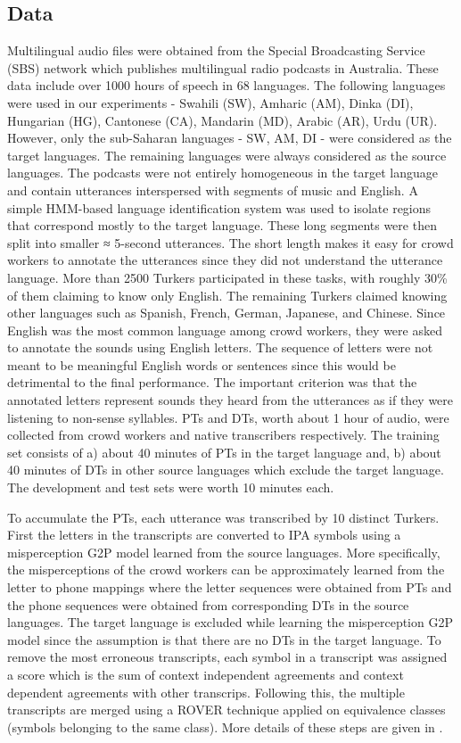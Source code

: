 \documentclass[a4paper]{article}
\begin{document}
\subsection{Data} \vspace{-1mm}
Multilingual audio files were obtained from the Special Broadcasting Service (SBS) network which publishes multilingual radio podcasts in Australia. These data include over 1000 hours of speech in 68 languages.
The following languages were used in our experiments - Swahili (SW), Amharic (AM), Dinka (DI), Hungarian (HG), Cantonese (CA), Mandarin (MD), Arabic (AR), Urdu (UR). However, only the sub-Saharan languages - SW, AM, DI - were considered as the target languages. The remaining languages were always considered as the source languages. The podcasts were not entirely homogeneous in the target language and contain utterances interspersed with segments of music and English. A simple HMM-based language identification system was used to isolate regions that correspond mostly to the target language. These long segments were then split into smaller ≈ 5-second utterances. The short length makes it easy for crowd workers to annotate the utterances since they did not understand the utterance language. More than 2500 Turkers participated in these tasks, with roughly 30\% of them claiming to know only English. The remaining Turkers claimed knowing other languages such as Spanish, French, German, Japanese, and Chinese. Since English was the most common language among crowd workers, they were asked to annotate the sounds using English letters. The sequence of letters were not meant to be meaningful English words or sentences since this would be detrimental to the final performance. The important criterion was that the annotated letters represent sounds they heard from the utterances as if they were listening to non-sense syllables. PTs and DTs, worth about 1 hour of audio, were collected from crowd workers and native transcribers respectively. The training set consists of a) about 40 minutes of PTs in the target language and, b) about 40 minutes of DTs in other source languages which exclude the target language. The development and test sets were worth 10 minutes each. 

To accumulate the PTs, each utterance was transcribed by 10 distinct Turkers. First the letters in the transcripts are converted to IPA symbols using a misperception G2P model learned from the source languages. More specifically, the misperceptions of the crowd workers can be approximately learned from the letter to phone mappings where the letter sequences were obtained from PTs and the phone sequences were obtained from corresponding DTs in the source languages. The target language is excluded while learning the misperception G2P model since the assumption is that there are no DTs in the target language. To remove the most erroneous transcripts, each symbol in a transcript was assigned a score which is the sum of context independent agreements and context dependent agreements with other transcrips. Following this, the multiple transcripts are merged using a ROVER technique applied on equivalence classes (symbols belonging to the same class). More details of these steps are given in \cite{Jyothi-MismatchedCrowdsourcingTrans}. 
\end{document}
